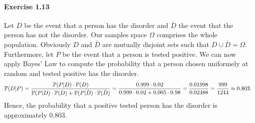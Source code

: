 \paragraph{Exercise 1.13}  Let $D$ be the event that a person has the disorder and
$\bar{D}$ the event that the person has not the disorder. Our samples space $\Omega$
comprises the whole population. Obviously $D$ and $\bar{D}$ are mutually disjoint
sets such that $D \cup \bar{D} = \Omega$. Furthermore, let $P$ be the event that
a person is tested positive. We can now apply Bayes' Law to compute the probability
that a person chosen uniformely at random and tested positive has the disorder.
\[
  \mathbb{P}(D|P)
    = \frac{\mathbb{P}(P|D) \cdot \mathbb{P}(D)}{\mathbb{P}(P|D) \cdot \mathbb{P}(D) + \mathbb{P}(P|\bar{D}) \cdot \mathbb{P}(\bar{D})}
    = \frac{0.999 \cdot 0.02}{0.999 \cdot 0.02 + 0.005 \cdot 0.98}
    = \frac{0.01998}{0.02488}
    = \frac{999}{1244}
    \approx 0.803.
\]
Hence, the probability that a positive tested person has the disorder is
approximately 0.803.
